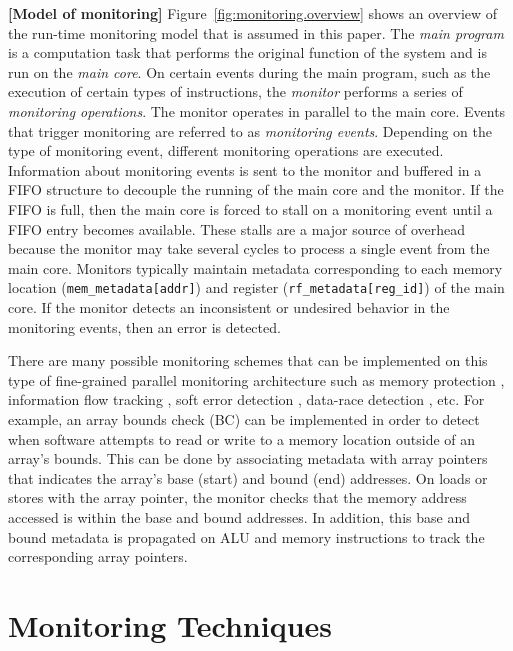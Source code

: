 \textbf{[Model of monitoring]}
Figure~\ref{fig:monitoring.overview} shows an overview of the run-time monitoring
model that is assumed in this paper.  The \emph{main program} is a computation
task that performs the original function of the system and is run on the
\emph{main core}.  On certain events during the main program, such as the
execution of certain types of instructions, the \emph{monitor} performs a
series of \emph{monitoring operations}. The monitor operates in parallel to the
main core. Events that trigger monitoring are referred to as \emph{monitoring
events}. Depending on the type of monitoring event, different monitoring
operations are executed. Information about monitoring events is sent to the
monitor and buffered in a FIFO structure to decouple the running of the main
core and the monitor. If the FIFO is full, then the main core is forced to
stall on a monitoring event until a FIFO entry becomes available. These stalls
are a major source of overhead because the monitor may take several cycles to
process a single event from the main core.  Monitors typically maintain
metadata corresponding to each memory location ({\tt mem\_metadata[addr]}) and
register ({\tt rf\_metadata[reg\_id]}) of the main core.  If the monitor
detects an inconsistent or undesired behavior in the monitoring events, then an
error is detected. 

There are many possible monitoring schemes that can be implemented on this type
of fine-grained parallel monitoring architecture such as memory protection
\cite{mondrian-asplos02}, information flow tracking \cite{dift-asplos04,
testudo-micro08}, soft error detection \cite{argus-micro07}, data-race
detection \cite{cord-hpca06, eraser-tocs97, literace-pldi09, pacer-pldi10}, etc.  For example, an array bounds
check (BC) \cite{hardbound-asplos08} can be implemented in order to detect when
software attempts to read or write to a memory location outside of an array's
bounds. This can be done by associating metadata with array pointers that
indicates the array's base (start) and bound (end) addresses. On loads or
stores with the array pointer, the monitor checks that the memory address
accessed is within the base and bound addresses. In addition, this base and
bound metadata is propagated on ALU and memory instructions to track the
corresponding array pointers.

\section{Monitoring Techniques}
\label{chap:monitoring.techniques}

